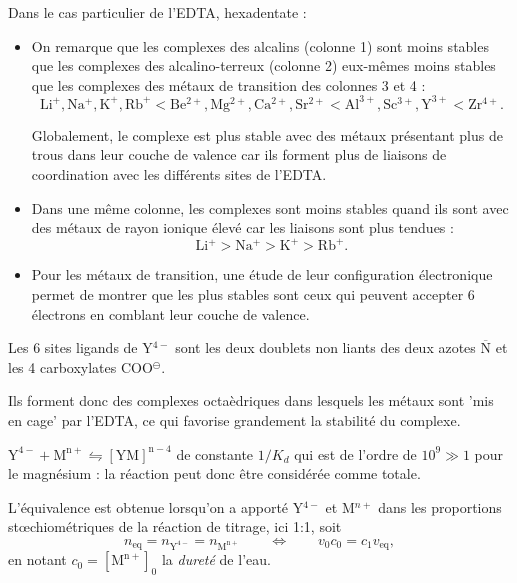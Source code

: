 \begin{solution}
\begin{questions}
    \questioncours Dans le cas particulier de l'EDTA, hexadentate :
    \begin{itemize}
        \item On remarque que les complexes des alcalins (colonne 1) sont moins stables que les complexes des alcalino-terreux (colonne 2) eux-mêmes moins stables que les complexes des métaux de transition des colonnes 3 et 4 :
        $$\mathrm{Li^+, Na^+, K^+, Rb^+ < Be^{2+}, Mg^{2+}, Ca^{2+}, Sr^{2+} < Al^{3+}, Sc^{3+}, Y^{3+} < Zr^{4+}.}$$
        
        Globalement, le complexe est plus stable avec des métaux présentant plus de trous dans leur couche de valence car ils forment plus de liaisons de coordination avec les différents sites de l'EDTA.
        
        \item Dans une même colonne, les complexes sont moins stables quand ils sont avec des métaux de rayon ionique élevé car les liaisons sont plus tendues :
        $$\mathrm{Li^+ > Na^+ > K^+ > Rb^+.}$$
        
        \item Pour les métaux de transition, une étude de leur configuration électronique permet de montrer que les plus stables sont ceux qui peuvent accepter 6 électrons en comblant leur couche de valence.
        
        \end{itemize}
    
    \question Les 6 sites ligands de Y$^{4-}$ sont les deux doublets non liants des deux azotes $\overline{\text{N}}$ et les 4 carboxylates COO$^\ominus$.
    
    Ils forment donc des complexes octaèdriques dans lesquels les métaux sont 'mis en cage' par l'EDTA, ce qui favorise grandement la stabilité du complexe.
    
    \question $\mathrm{Y^{4-} + M^{n+} \leftrightharpoons [YM]^{n-4}}$ de constante $1/K_d$ qui est de l'ordre de $10^9 \gg 1$ pour le magnésium : la réaction peut donc être considérée comme totale.
    
    \question L’équivalence est obtenue lorsqu’on a apporté Y$^{4-}$ et M$^{n+}$ dans les proportions st{\oe}chiométriques de la réaction de titrage, ici 1:1, soit
    $$n_\text{eq} = n_\mathrm{Y^{4-}} = n_\mathrm{M^{n+}} \qquad \Longleftrightarrow \qquad v_0 c_0 = c_1 v_\text{eq},$$
    en notant $c_0 = \mathrm{[M^{n+}]}_0$ la \emph{dureté} de l'eau.
    

\end{questions}
\end{solution}
